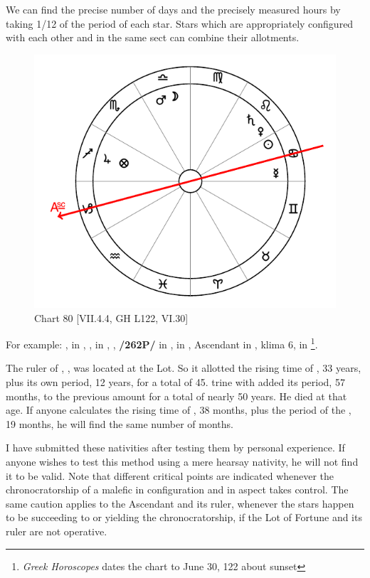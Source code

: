 We can find the precise number of days and the precisely measured hours by taking 1/12 of the period of each star. Stars which are appropriately configured with each other and in the same sect can combine their allotments. 

\newpage
\begin{figure}
\centering
\vspace{-10pt}
\includegraphics[width=.68\textwidth]{charts/7_4_4}
\caption{Chart 80 [VII.4.4, GH L122, VI.30]}
\label{fig:chart80}
\end{figure} 

For example: \Sun, \Mercury\xspace in \Cancer, \Moon, \Mars\xspace in \Libra, \Saturn, \Venus\xspace \textbf{/262P/} in \Leo, \Jupiter\xspace in \Sagittarius, Ascendant in \Capricorn, klima 6, \Fortune\xspace in \Sagittarius\footnote{\textit{Greek Horoscopes} dates the chart to June 30, 122 about sunset}. 

The ruler of \Sagittarius, \Jupiter, was located at the Lot. So it allotted the rising time of \Sagittarius, 33 years, plus its own period, 12 years, for a total of 45. \Saturn\xspace trine with \Jupiter\xspace added its period, 57 months, to the previous amount for a total of nearly 50 years. He died at that age. If anyone calculates the rising time of \Leo, 38 months, plus the period of the \Sun, 19 months, he will find the same number of months.

I have submitted these nativities after testing them by personal experience. If anyone wishes to test this method using a mere hearsay nativity, he will not find it to be valid. Note that different critical points
are indicated whenever the chronocratorship of a malefic in configuration and in aspect takes control. The same caution applies to the Ascendant and its ruler, whenever the stars happen to be succeeding to or yielding the chronocratorship, if the Lot of Fortune and its ruler are not operative.

\newpage